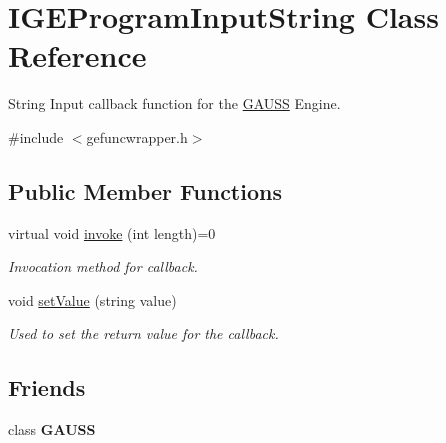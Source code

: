 \hypertarget{class_i_g_e_program_input_string}{\section{I\-G\-E\-Program\-Input\-String Class Reference}
\label{class_i_g_e_program_input_string}
}


String Input callback function for the \hyperlink{class_g_a_u_s_s}{G\-A\-U\-S\-S} Engine.  




{\ttfamily \#include $<$gefuncwrapper.\-h$>$}

\subsection*{Public Member Functions}
\begin{DoxyCompactItemize}
\item 
virtual void \hyperlink{class_i_g_e_program_input_string_aff170652d98f6a992a27134a7c674e01}{invoke} (int length)=0
\begin{DoxyCompactList}\small\item\em Invocation method for callback. \end{DoxyCompactList}\item 
\hypertarget{class_i_g_e_program_input_string_ac692d94b650c29fe8d82690c78003be6}{void \hyperlink{class_i_g_e_program_input_string_ac692d94b650c29fe8d82690c78003be6}{set\-Value} (string value)}\label{class_i_g_e_program_input_string_ac692d94b650c29fe8d82690c78003be6}

\begin{DoxyCompactList}\small\item\em Used to set the return value for the callback. \end{DoxyCompactList}\end{DoxyCompactItemize}
\subsection*{Friends}
\begin{DoxyCompactItemize}
\item 
\hypertarget{class_i_g_e_program_input_string_abc89e64d0ec6c939575c3125753c6309}{class {\bfseries G\-A\-U\-S\-S}}\label{class_i_g_e_program_input_string_abc89e64d0ec6c939575c3125753c6309}

\end{DoxyCompactItemize}


